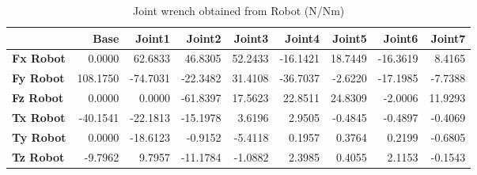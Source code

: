 \begin{table}[h!]
	\centering
	\caption{Joint wrench obtained from Robot (N/Nm)}
	\label{wrech_Robot_Pose6}
	\begin{tabular}{|l|r|r|r|r|r|r|r|r|}
		\hline
		\textbf{} & \textbf{Base} & \textbf{Joint1}  & \textbf{Joint2}  & \textbf{Joint3}  & \textbf{Joint4}  & \textbf{Joint5}  & \textbf{Joint6}  & \textbf{Joint7} \\ \hline
		\textbf{Fx Robot}  & 0.0000        & 62.6833        & 46.8305        & 52.2433        & -16.1421        & 18.7449        & -16.3619        & 8.4165 \\ \hline
		\textbf{Fy Robot}  & 108.1750        & -74.7031        & -22.3482        & 31.4108        & -36.7037        & -2.6220        & -17.1985        & -7.7388 \\ \hline
		\textbf{Fz Robot}  & 0.0000        & 0.0000        & -61.8397        & 17.5623        & 22.8511        & 24.8309        & -2.0006        & 11.9293 \\ \hline
		\textbf{Tx Robot}  & -40.1541        & -22.1813        & -15.1978        & 3.6196        & 2.9505        & -0.4845        & -0.4897        & -0.4069 \\ \hline
		\textbf{Ty Robot}  & 0.0000        & -18.6123        & -0.9152        & -5.4118        & 0.1957        & 0.3764        & 0.2199        & -0.6805 \\ \hline
		\textbf{Tz Robot}  & -9.7962        & 9.7957        & -11.1784        & -1.0882        & 2.3985        & 0.4055        & 2.1153        & -0.1543 \\ \hline
	\end{tabular}
\end{table}

